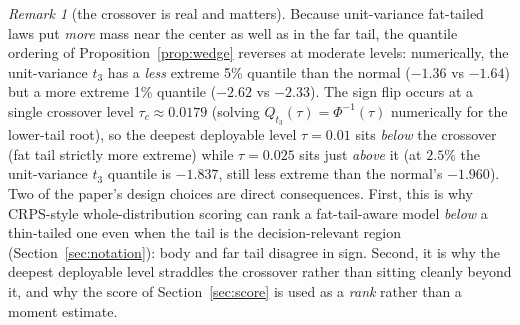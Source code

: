 \documentclass[11pt]{article}
\theoremstyle{remark}
\newtheorem{remark}{Remark}
\begin{document}
\begin{remark}[the crossover is real and matters]\label{rem:crossover}
Because unit-variance fat-tailed laws put \emph{more} mass near the
center as well as in the far tail, the quantile ordering of
Proposition~\ref{prop:wedge} reverses at moderate levels: numerically,
the unit-variance $t_3$ has a \emph{less} extreme 5\% quantile than the
normal ($-1.36$ vs $-1.64$) but a more extreme 1\% quantile ($-2.62$ vs
$-2.33$). The sign flip occurs at a single crossover level
$\tau_c \approx 0.0179$ (solving $Q_{t_3}(\tau)=\Phi^{-1}(\tau)$
numerically for the lower-tail root), so the deepest deployable level
$\tau = 0.01$ sits \emph{below} the crossover (fat tail strictly more
extreme) while $\tau = 0.025$ sits just \emph{above} it (at $2.5\%$ the
unit-variance $t_3$ quantile is $-1.837$, still less extreme than the
normal's $-1.960$). Two of the paper's design choices are direct
consequences. First, this is why CRPS-style whole-distribution
scoring can rank a fat-tail-aware model \emph{below} a thin-tailed one
even when the tail is the decision-relevant region
(Section~\ref{sec:notation}): body and far tail disagree in sign.
Second, it is why the deepest deployable level straddles the crossover
rather than sitting cleanly beyond it, and why the score of
Section~\ref{sec:score} is used as a \emph{rank} rather than a moment
estimate.
\end{remark}
\end{document}
